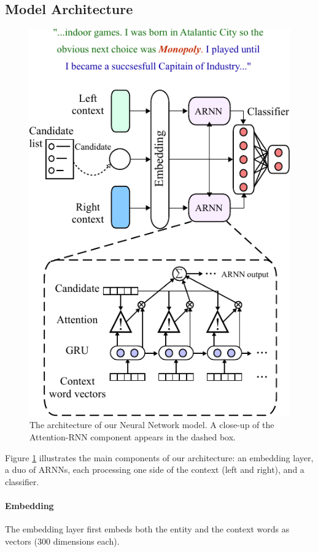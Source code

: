 \documentclass[11pt,letterpaper]{article}
\begin{document}
	\subsection{Model Architecture}
	
	\begin{figure}[t]
		\centering
		\includegraphics[scale=0.92]{diagrams/model_color_v4.pdf}
		\caption{The architecture of our Neural Network model. A close-up of the Attention-RNN component appears in the dashed box.}
		\label{fig:arnn}
	\end{figure}	
	
	Figure \ref{fig:arnn} illustrates the main components of our architecture: an embedding layer, a duo of ARNNs, each processing one side of the context (left and right), %
	and a classifier. 
	
	
	\paragraph{Embedding}
	The embedding layer first embeds both the entity and the context words as vectors (300 dimensions each).
	
\end{document}
